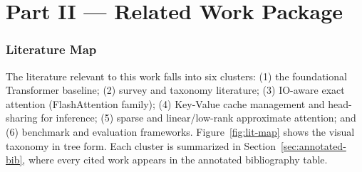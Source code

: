 \documentclass[11pt]{article}
\begin{document}
\newpage

\part*{Part II --- Related Work Package}

\section{Literature Map}
\label{sec:lit-map}

The literature relevant to this work falls into six clusters: (1) the foundational Transformer baseline; (2) survey and taxonomy literature; (3) IO-aware exact attention (FlashAttention family); (4) Key-Value cache management and head-sharing for inference; (5) sparse and linear/low-rank approximate attention; and (6) benchmark and evaluation frameworks. Figure~\ref{fig:lit-map} shows the visual taxonomy in tree form. Each cluster is summarized in Section~\ref{sec:annotated-bib}, where every cited work appears in the annotated bibliography table.
\end{document}
